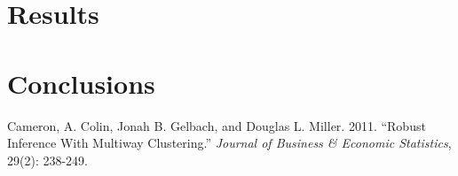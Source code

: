 \documentclass[12pt,a4paper]{article}%
\begin{document}
\section{Results}
\section{Conclusions}


\begin{thebibliography}{99}                                                                                                %
\bibitem{} Cameron, A. Colin, Jonah B. Gelbach, and Douglas L. Miller. 2011. ``Robust Inference With Multiway Clustering.'' \textit{Journal of Business \& Economic Statistics}, 29(2): 238-249.	
\end{thebibliography}
\end{document}
